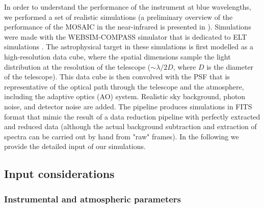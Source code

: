 \documentclass{aa}
\begin{document}
In order to understand the performance of the instrument at blue wavelengths, we performed a set of realistic simulations (a preliminary overview of the performance of the MOSAIC in the near-infrared is presented in \citet{Disseau2014}). Simulations were made with the WEBSIM-COMPASS simulator that is dedicated to ELT simulations \citep{Puech2010,Puech2016}. The astrophysical target in these simulations is first modelled as a high-resolution data cube, where the spatial dimensions sample the light distribution at the resolution of the telescope ($\sim \lambda/2D$, where $D$ is the diameter of the telescope). This data cube is then convolved with the PSF that is representative of the optical path through the telescope and the atmosphere, including the adaptive optics (AO) system. Realistic sky background, photon noise, and detector noise are added. The pipeline produces simulations in FITS format that mimic the result of a data reduction pipeline with perfectly extracted and reduced data (although the actual background subtraction and extraction of spectra can be carried out by hand from "raw" frames). In the following we provide the detailed input of our simulations.

\subsection{Input considerations}
\label{inputs}

\subsubsection{Instrumental and atmospheric parameters}
\label{atmospheric}
\end{document}
